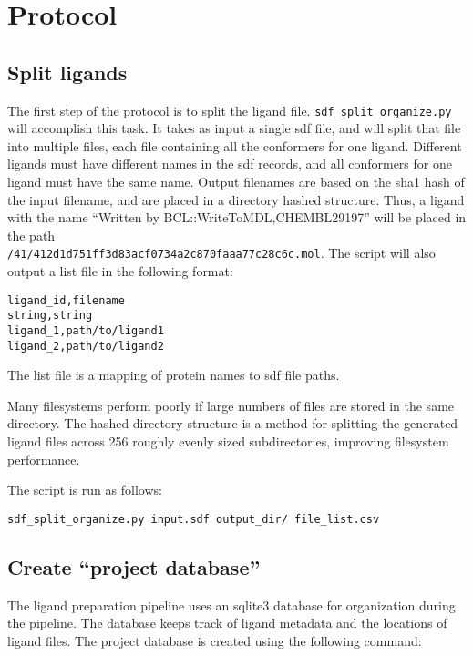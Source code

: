 \section{Protocol}

\subsection{Split ligands}

The first step of the protocol is to split the ligand file.
\texttt{sdf\_split\_organize.py} will accomplish this task. 
It takes as input a single sdf file, and will split that file into multiple files, each file containing all the conformers for one ligand.
Different ligands must have different names in the sdf records, and all conformers for one ligand must have the same name. 
Output filenames are based on the sha1 hash of the input filename, and are placed in a directory hashed structure.
Thus, a ligand with the name ``Written by BCL::WriteToMDL,CHEMBL29197''
will be placed in the path\\
\texttt{/41/412d1d751ff3d83acf0734a2c870faaa77c28c6c.mol}.
The script will also output a list file in the following format:

\begin{verbatim}
ligand_id,filename
string,string
ligand_1,path/to/ligand1
ligand_2,path/to/ligand2
\end{verbatim}

The list file is a mapping of protein names to sdf file paths.

Many filesystems perform poorly if large numbers of files are stored in the same directory. 
The hashed directory structure is a method for splitting the generated ligand files across 256 roughly evenly sized subdirectories, improving filesystem performance.

The script is run as follows:

\begin{verbatim}
sdf_split_organize.py input.sdf output_dir/ file_list.csv
\end{verbatim}

\subsection{Create ``project database''}

The ligand preparation pipeline uses an sqlite3 database for organization during the pipeline.
The database keeps track of ligand metadata and the locations of ligand files.
The project database is created using the following command:

